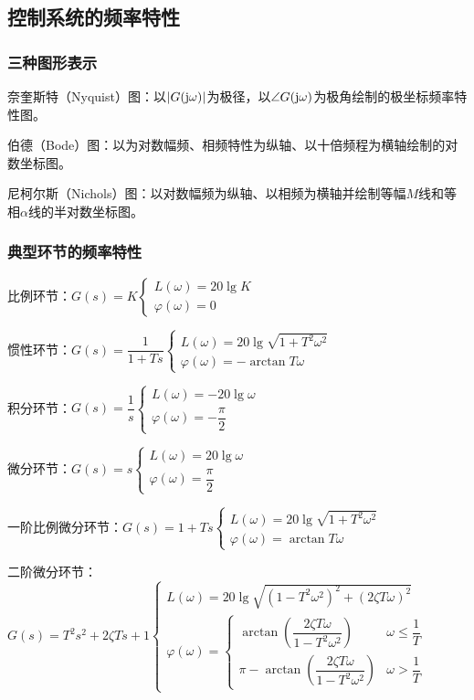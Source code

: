 \documentclass[11pt,a4paper]{ctexart}
\renewcommand{\j}{{\rm j}}
\begin{document}
    \subsection{控制系统的频率特性}
        \subsubsection{三种图形表示}
            奈奎斯特（Nyquist）图：以$|G(\j\omega)|$为极径，以$\angle G(\j\omega)$为极角绘制的极坐标频率特性图。

            伯德（Bode）图：以为对数幅频、相频特性为纵轴、以十倍频程为横轴绘制的对数坐标图。

            尼柯尔斯（Nichols）图：以对数幅频为纵轴、以相频为横轴并绘制等幅$M$线和等相$\alpha$线的半对数坐标图。
        \subsubsection{典型环节的频率特性}
            比例环节：$G(s)=K\begin{cases}L(\omega)=20\lg K\\\varphi(\omega)=0\end{cases}$

            惯性环节：$G(s)=\dfrac{1}{1+Ts}\begin{cases}L(\omega)=20\lg\sqrt{1+T^2\omega^2}\\\varphi(\omega)=-\arctan T\omega\end{cases}$

            积分环节：$G(s)=\dfrac{1}{s}\begin{cases}L(\omega)=-20\lg\omega\\\varphi(\omega)=-\dfrac{\pi}{2}\end{cases}$

            微分环节：$G(s)=s\begin{cases}L(\omega)=20\lg\omega\\\varphi(\omega)=\dfrac{\pi}{2}\end{cases}$

            一阶比例微分环节：$G(s)=1+Ts\begin{cases}L(\omega)=20\lg\sqrt{1+T^2\omega^2}\\\varphi(\omega)=\arctan T\omega\end{cases}$

            二阶微分环节：$G(s)=T^2s^2+2\zeta Ts+1\begin{cases}L(\omega)=20\lg\sqrt{(1-T^2\omega^2)^2+(2\zeta T\omega)^2}\\
            \varphi(\omega)=\begin{cases}\arctan(\dfrac{2\zeta T\omega}{1-T^2\omega^2})& \omega\leq\dfrac1T\\
            \pi-\arctan(\dfrac{2\zeta T\omega}{1-T^2\omega^2})&\omega>\dfrac1T\end{cases}\end{cases}$
\end{document}
